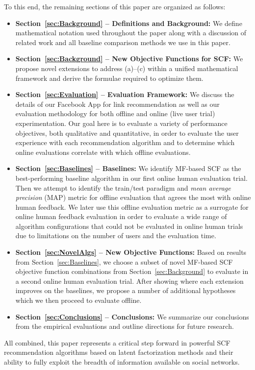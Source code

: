 To this end, the remaining sections of this paper are organized as follows:
\begin{itemize}
\item {\bf Section~\ref{sec:Background} -- Definitions and Background:} 
We define mathematical notation used throughout the paper along
with a discussion of related work and all baseline comparison methods
we use in this paper.
\item {\bf Section~\ref{sec:Background} -- New Objective Functions for
SCF:} We propose novel extensions to address (a)--(c) within a unified
mathematical framework and derive the formulae required to optimize them.
\item {\bf Section~\ref{sec:Evaluation} -- Evaluation Framework:} We
discuss the details of our Facebook App for link
recommendation as well as our evaluation methodology for both offline
and online (live user trial) experimentation.  
\COMMENT Our goal here
is to evaluate a variety of performance objectives, both qualitative
and quantitative, in order to evaluate the user experience with each
recommendation algorithm and to determine which online evaluations
correlate with which offline evaluations.  
\ENDCOMMENT
\item {\bf Section~\ref{sec:Baselines} -- Baselines:} We
identify MF-based SCF as the best-performing baseline algorithm in
our first online human evaluation trial.  Then we attempt to
identify the train/test paradigm and \emph{mean average precision}
(MAP) metric for offline evaluation that agrees the most with online
human feedback.  We later use this offline evaluation metric as a
surrogate for online human feedback evaluation in order to evaluate a
wide range of algorithm configurations that could not be evaluated
in online human trials due to limitations on the number of users and
the evaluation time.
\item {\bf Section~\ref{sec:NovelAlgs} -- New Objective Functions:}
Based on results from Section~\ref{sec:Baselines}, we choose a subset
of novel MF-based SCF objective function combinations from
Section~\ref{sec:Background} to evaluate in a second online human
evaluation trial.  After showing where each extension improves on the
baselines, we propose a number of additional hypotheses which we then
proceed to evaluate offline.
\item {\bf Section~\ref{sec:Conclusions} -- Conclusions:} We summarize
our conclusions from the empirical evaluations and outline directions
for future research.
\end{itemize}

All combined, this paper represents a critical step forward in
powerful SCF recommendation algorithms based on latent factorization
methods and their ability to fully exploit the breadth of information
available on social networks.
